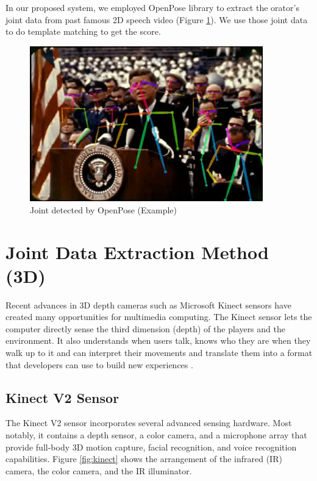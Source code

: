 \par In our proposed system, we employed OpenPose library to extract the orator's joint data from past famous 2D speech video (Figure \ref{fig:jfkexample}). We use those joint data to do template matching to get the score.
\begin{figure}[!htbp]
  \centering\includegraphics[width=0.9\textwidth]{./img/jfk.png}
  \caption{Joint detected by OpenPose (Example)}\label{fig:jfkexample}
\end{figure}



\section{Joint Data Extraction Method (3D)}
\par Recent advances in 3D depth cameras such as Microsoft Kinect sensors have created many opportunities for multimedia computing. The Kinect sensor lets the computer directly sense the third dimension (depth) of the players and the environment. It also understands when users talk, knows who they are when they walk up to it and can interpret their movements and translate them into a format that developers can use to build new experiences \cite{Zhang2012}.
\subsection*{Kinect V2 Sensor}
\par The Kinect V2 sensor incorporates several advanced sensing hardware. Most notably, it contains a depth sensor, a color camera, and a microphone array that provide full-body 3D motion capture, facial recognition, and voice recognition capabilities. Figure \ref{fig:kinect} shows the arrangement of the infrared (IR) camera, the color camera, and the IR illuminator. 

